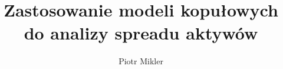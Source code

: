 \documentclass[mfu, pdftex]{mgrwms}
\begin{document}
\title{\LARGE Zastosowanie modeli kopułowych do analizy spreadu aktywów}
\author{Piotr Mikler}
\maketitle
{}

\newtheorem{thm}{\indent Twierdzenie}[chapter]
\newtheorem{lemma}[thm]{\indent Lemat}
\newtheorem{cor}[thm]{\indent Wniosek}
\newtheorem{obs}[thm]{\indent Obserwacja}
\newtheorem{uw}[thm]{\indent Uwaga}
\newtheorem{df}[thm]{Definicja}
\newcommand{\E}{\mathbb{E}}
\newcommand{\R}{\mathbb{R}}
\newcommand{\Pra}{\mathbb{Pra}}

\makeatletter
\newcommand*{\defeq}{\mathrel{\rlap{%
                     \raisebox{0.3ex}{$\m@th\cdot$}}%
                     \raisebox{-0.3ex}{$\m@th\cdot$}}%
                     =}
\let\c@table\c@figure
\makeatother



\tableofcontents




 
\end{document}
